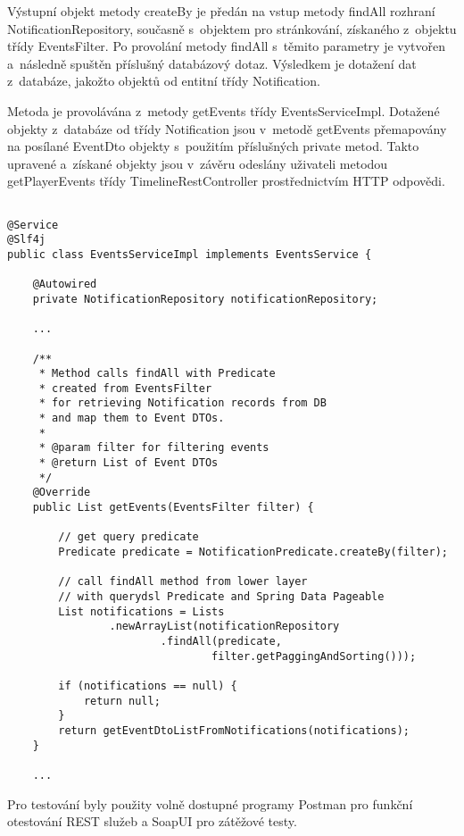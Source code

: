 \documentclass[twoside, 12pt]{article}
\begin{document}
{Výstupní objekt metody createBy je předán na vstup metody findAll rozhraní NotificationRepository,
současně s~objektem pro stránkování, získaného z~objektu třídy EventsFilter.
Po provolání metody findAll s~těmito parametry je vytvořen a~následně spuštěn příslušný databázový dotaz.
Výsledkem je dotažení dat z~databáze, jakožto objektů od entitní třídy Notification.

Metoda je provolávána z~metody getEvents třídy EventsServiceImpl.
Dotažené objekty z~databáze od třídy Notification jsou v~metodě getEvents
přemapovány na posílané EventDto objekty s~použitím příslušných private metod.
Takto upravené a~získané objekty jsou v~závěru odeslány uživateli metodou getPlayerEvents
třídy TimelineRestController prostřednictvím HTTP odpovědi.


\clearpage

\begin{lstlisting}

@Service
@Slf4j
public class EventsServiceImpl implements EventsService {

    @Autowired
    private NotificationRepository notificationRepository;

    ...

    /**
     * Method calls findAll with Predicate
     * created from EventsFilter
     * for retrieving Notification records from DB
     * and map them to Event DTOs.
     *
     * @param filter for filtering events
     * @return List of Event DTOs
     */
    @Override
    public List getEvents(EventsFilter filter) {

        // get query predicate
        Predicate predicate = NotificationPredicate.createBy(filter);

        // call findAll method from lower layer
        // with querydsl Predicate and Spring Data Pageable
        List notifications = Lists
                .newArrayList(notificationRepository
                        .findAll(predicate,
                                filter.getPaggingAndSorting()));

        if (notifications == null) {
            return null;
        }
        return getEventDtoListFromNotifications(notifications);
    }

    ...

\end{lstlisting}


\clearpage


Pro testování byly použity volně dostupné programy Postman pro funkční otestování REST služeb
a SoapUI pro zátěžové testy.

}
\end{document}
